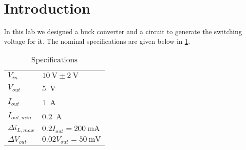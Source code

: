 \section{Introduction}
In this lab we designed a buck converter and a circuit to generate the switching voltage for it. The nominal specifications are given below in \cref{tab:specs}.

\begin{table}[h]
	\centering
	\caption{Specifications}
	\begin{tabular}{ll}
		\toprule
		$V_{in}$ & $\SI{10}{\volt}\pm\SI{2}{\volt}$\\
		$V_{out}$ & \SI{5}{\volt}\\
		$I_{out}$ & \SI{1}{\ampere}\\
		$I_{out,min}$ & \SI{0.2}{\ampere}\\
		$\Delta i_{L,max}$ & $0.2I_{out}=\SI{200}{\milli\ampere}$\\
		$\Delta V_{out}$ & $0.02V_{out}=\SI{50}{\milli\volt}$\\
		\bottomrule
	\end{tabular}
	\label{tab:specs}
\end{table}